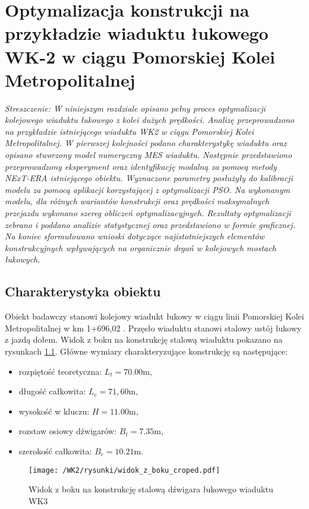 \chapter{Optymalizacja konstrukcji na przykładzie wiaduktu łukowego WK-2 w ciągu Pomorskiej Kolei Metropolitalnej}

\textit{Streszczenie: W niniejszym rozdziale opisano pełny proces optymalizacji kolejowego wiaduktu łukowego z  kolei dużych prędkości. Analizę przeprowadzono na przykładzie istniejącego wiaduktu WK2 w ciągu Pomorskiej Kolei Metropolitalnej. W pierwszej kolejności podano charakterystykę wiaduktu oraz opisano stworzony model numeryczny MES wiaduktu. Następnie przedstawiono przeprowadzony eksperyment oraz identyfikację modalną za pomocą metody NExT-ERA istniejącego obiektu. Wyznaczone parametry posłużyły do kalibracji modelu za pomocą aplikacji korzystającej z optymalizacji PSO. Na wykonanym modelu, dla różnych wariantów konstrukcji oraz prędkości maksymalnych przejazdu wykonano szereg obliczeń optymalizacyjnych. Rezultaty optymalizacji zebrano i poddano analizie statystycznej oraz przedstawiono w formie graficznej. Na koniec sformułowano wnioski dotyczące najistotniejszych elementów konstrukcyjnych wpływających na organicznie drgań w kolejowych mostach łukowych.}


\section{Charakterystyka obiektu}
Obiekt badawczy stanowi kolejowy wiadukt łukowy w ciągu linii Pomorskiej Kolei Metropolitalnej w km 1+696,02 \parencite{Filipiuk2015,TransprojektGdanski2014}. Przęsło wiaduktu stanowi stalowy ustój łukowy z jazdą dołem. Widok z boku na konstrukcję stalową wiaduktu pokazano na rysunkach \ref{fig: wk2_side_view}. Główne wymiary charakteryzujące konstrukcję są następujące: 
\begin{itemize}[noitemsep]
	\item rozpiętość teoretyczna: $L_t=70.00 \text{m}$, 
	\item długość całkowita:  $L_c=71,60 \text{m}$, 
	\item wysokość w kluczu:  $H=11.00 \text{m}$,
	\item rozstaw osiowy dźwigarów: $B_t = 7.35 \text{m}$,
	\item szerokość całkowita: $B_c=10.21 \text{m}$. 
\end{itemize}
 \begin{figure}[hbt!]
	\centering
	\texttt{[image: /WK2/rysunki/widok\_z\_boku\_croped.pdf]}
	\captionsetup{justification=centering}
	\caption{Widok z boku na konstrukcję stalową dźwigara łukowego wiaduktu WK3}
	\label{fig: wk2_side_view}
\end{figure}

